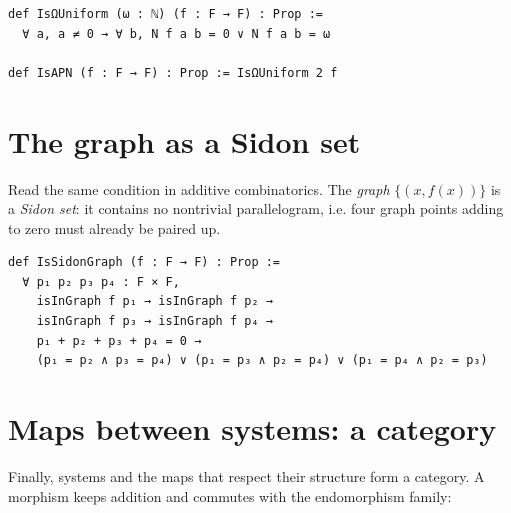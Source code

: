\documentclass[11pt]{article}
\begin{document}
\begin{lstlisting}
def IsΩUniform (ω : ℕ) (f : F → F) : Prop :=
  ∀ a, a ≠ 0 → ∀ b, N f a b = 0 ∨ N f a b = ω

def IsAPN (f : F → F) : Prop := IsΩUniform 2 f
\end{lstlisting}

\section{The graph as a Sidon set}

Read the same condition in additive combinatorics.  The \emph{graph}
$\{(x,f(x))\}$ is a \emph{Sidon set}: it contains no nontrivial parallelogram,
i.e. four graph points adding to zero must already be paired up.

\begin{center}
\end{center}

\begin{lstlisting}
def IsSidonGraph (f : F → F) : Prop :=
  ∀ p₁ p₂ p₃ p₄ : F × F,
    isInGraph f p₁ → isInGraph f p₂ →
    isInGraph f p₃ → isInGraph f p₄ →
    p₁ + p₂ + p₃ + p₄ = 0 →
    (p₁ = p₂ ∧ p₃ = p₄) ∨ (p₁ = p₃ ∧ p₂ = p₄) ∨ (p₁ = p₄ ∧ p₂ = p₃)
\end{lstlisting}

\section{Maps between systems: a category}

Finally, systems and the maps that respect their structure form a category.
A morphism keeps addition and commutes with the endomorphism family:

\begin{center}
\end{center}
\end{document}
